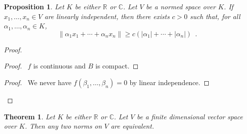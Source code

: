 \documentclass{book}
\let\qed\relax
\newtheorem{prop}[ax]{Proposition}
\newtheorem{thm}[ax]{Theorem}
\theoremstyle{definition}
\begin{document}
\begin{prop}
\label{prop:norm0lm}
Let $K$ be either $\mathbb{R}$ or $\mathbb{C}$. Let $V$ be a normed space over $K$. If $x_1, \ldots, x_n \in V$ are linearly independent, then there exists $c > 0$ such that, for all $\alpha_1, \ldots, \alpha_n \in K$,
\[ \| \alpha_1 x_1 + \cdots + \alpha_n x_n \| \geq c (|\alpha_1| + \cdots + |\alpha_n|) \enspace . \]
\end{prop}

\begin{proof}
\pf
{}
\begin{proof}
	\pf\ $f$ is continuous and $B$ is compact.
\end{proof}
\begin{proof}
	\pf\ We never have $f(\beta_1, \ldots, \beta_n) = 0$ by linear independence.
\end{proof}
\qed
\end{proof}

\begin{thm}
Let $K$ be either $\mathbb{R}$ or $\mathbb{C}$. Let $V$ be a finite dimensional vector space over $K$. Then any two norms on $V$ are equivalent.
\end{thm}
\end{document}

